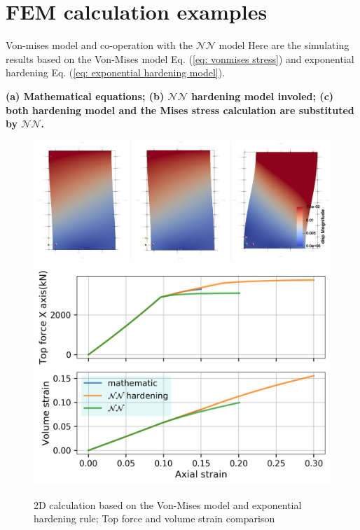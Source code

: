 \documentclass[aspectratio=169]{beamer}
\begin{document}
\section{FEM calculation examples}

\begin{frame}{Von-mises model and co-operation with the $\mathcal{NN}$ model}
	\fontsize{9}{9}\selectfont
	Here are the simulating results based on the Von-Mises model Eq. (\ref{eq: vonmises stress}) and exponential hardening Eq. (\ref{eq: exponential hardening model}).
	
	\vspace{5mm}
	\textbf{(a) Mathematical equations; (b) $\mathcal{NN}$ hardening model involed; (c) both hardening model and the Mises stress calculation are substituted by $\mathcal{NN}$.}
	\begin{figure}
		\centering
		\includegraphics[width=0.6\linewidth]{./pic/mises/displacement.png}
		\includegraphics[width=0.35\linewidth]{./pic/mises/footing_Top_force.png}
		\caption{2D calculation based on the Von-Mises model and exponential hardening rule; Top force and volume strain comparison}
		\label{fig: vonmises 2d u}
	\end{figure}
%
\end{frame}
\end{document}
